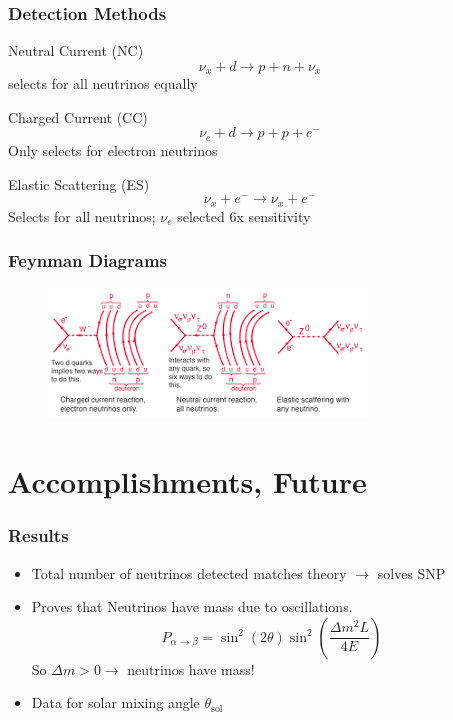 \documentclass[10pt]{beamer}
\begin{document}
\begin{frame}
	\end{frame}

	\begin{frame}
		\frametitle{Detection Methods}
		\begin{block}{Neutral Current (NC)}
		\[ \nu_x + d \rightarrow p + n + \nu_x\]
		selects for all neutrinos equally
		\end{block}
		\begin{block}{Charged Current (CC)}
		\[ \nu_e + d \rightarrow p + p + e^-\]
		Only selects for electron neutrinos
		\end{block}
		\begin{block}{Elastic Scattering (ES)}
		\[ \nu_x + e^- \rightarrow \nu_x + e^-\]
		Selects for all neutrinos; $\nu_e$ selected 6x sensitivity
		\end{block} 
	\end{frame}

	\begin{frame}
		\frametitle{Feynman Diagrams}
		\begin{figure}
			\includegraphics[scale=0.9]{reactions.png}
		\end{figure}
	\end{frame}

	\section{Accomplishments, Future}

	\begin{frame}
		\frametitle{Results}
	\begin{itemize}
		\item Total number of neutrinos detected matches theory $\rightarrow$ solves SNP
		\item Proves that Neutrinos have mass due to oscillations.
		\[ P_{\alpha \to \beta} = \sin^2(2\theta)\sin^2\left( \frac{\Delta m^2 L}{4E}\right)\]
		So $\Delta m > 0 \rightarrow$ neutrinos have mass!
		\item Data for solar mixing angle $\theta_{\text{sol}}$
	\end{itemize}
	\end{frame}
\end{document}
